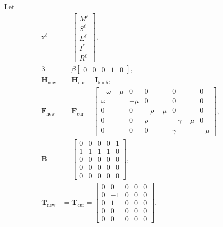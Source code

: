 \documentclass[USenglish]{article}
\renewcommand{\vec}[1]{\boldsymbol{\mathrm{#1}}}
\newcommand{\mat}[1]{\mathbf{#1}}
\begin{document}
Let
\begin{subequations}
  \begin{align}
    \vec{x}^{\ell} &=
    \begin{bmatrix}
      M^{\ell} \\ S^{\ell} \\ E^{\ell} \\ I^{\ell} \\ R^{\ell}
    \end{bmatrix},
    \\
    \vec{\beta} &=
    \beta
    \begin{bmatrix}
      0 & 0 & 0 & 1 & 0
    \end{bmatrix},
    \\
    \mat{H}_{\mathrm{new}} &=
    \mat{H}_{\mathrm{cur}} =
    \mat{I}_{5 \times 5},
    \\
    \mat{F}_{\mathrm{new}} &=
    \mat{F}_{\mathrm{cur}} =
    \begin{bmatrix}
      - \omega - \mu & 0 & 0 & 0 & 0 \\
      \omega & - \mu & 0 & 0 & 0 \\
      0 & 0 & - \rho - \mu & 0 & 0 \\
      0 & 0 & \rho & - \gamma - \mu & 0 \\
      0 & 0 & 0 & \gamma & - \mu
    \end{bmatrix},
    \\
    \mat{B} &=
    \begin{bmatrix}
      0 & 0 & 0 & 0 & 1 \\
      1 & 1 & 1 & 1 & 0 \\
      0 & 0 & 0 & 0 & 0 \\
      0 & 0 & 0 & 0 & 0 \\
      0 & 0 & 0 & 0 & 0
    \end{bmatrix},
    \\
    \mat{T}_{\mathrm{new}} &=
    \mat{T}_{\mathrm{cur}} =
    \begin{bmatrix}
      0 & 0 & 0 & 0 & 0 \\
      0 & -1 & 0 & 0 & 0 \\
      0 & 1 & 0 & 0 & 0 \\
      0 & 0 & 0 & 0 & 0 \\
      0 & 0 & 0 & 0 & 0
    \end{bmatrix}.
  \end{align}
\end{subequations}
\end{document}
